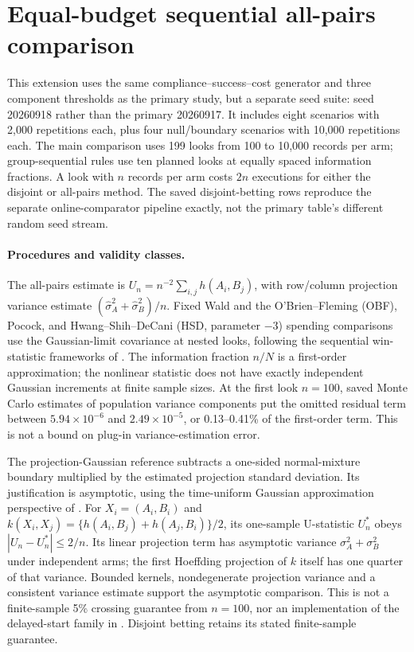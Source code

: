 \section{Equal-budget sequential all-pairs comparison}
\label{app:ustat_extension}
This extension uses the same compliance--success--cost generator and
three component thresholds as the primary study, but a separate seed
suite: seed 20260918 rather than the primary 20260917. It includes eight
scenarios with 2,000 repetitions each, plus four null/boundary scenarios
with 10,000 repetitions each. The main comparison uses 199 looks from
100 to 10,000 records per arm; group-sequential rules use ten planned
looks at equally spaced information fractions. A look with $n$ records
per arm costs $2n$ executions for either the disjoint or all-pairs method.
The saved disjoint-betting rows reproduce the separate online-comparator
pipeline exactly, not the primary table's different random seed stream.

\paragraph{Procedures and validity classes.}
The all-pairs estimate is $U_n=n^{-2}\sum_{i,j}h(A_i,B_j)$, with
row/column projection variance estimate
$(\widehat\sigma_A^2+\widehat\sigma_B^2)/n$.
Fixed Wald and the O'Brien--Fleming (OBF), Pocock, and Hwang--Shih--DeCani
(HSD, parameter $-3$) spending comparisons use the Gaussian-limit
covariance at nested looks, following the sequential win-statistic
frameworks of \citet{zhang2024sequential,bergemann2026group}.
The information fraction $n/N$ is a first-order approximation; the
nonlinear statistic does not have exactly independent Gaussian increments
at finite sample sizes. At the first look $n=100$, saved Monte Carlo
estimates of population variance components put the omitted residual term between
$5.94\times10^{-6}$ and $2.49\times10^{-5}$, or 0.13--0.41\% of the
first-order term. This is not a bound on plug-in variance-estimation error.

The projection-Gaussian reference subtracts a one-sided normal-mixture
boundary multiplied by the estimated projection standard deviation.
Its justification is asymptotic, using the time-uniform Gaussian
approximation perspective of \citet{waudbysmith2024timeuniform}.
For $X_i=(A_i,B_i)$ and
$k(X_i,X_j)=\{h(A_i,B_j)+h(A_j,B_i)\}/2$, its one-sample U-statistic
$U_n^*$ obeys $|U_n-U_n^*|\leq2/n$. Its linear projection term has
asymptotic variance $\sigma_A^2+\sigma_B^2$ under independent arms;
the first Hoeffding projection of $k$ itself has one quarter of that
variance. Bounded kernels,
nondegenerate projection variance and a consistent variance estimate
support the asymptotic comparison. This is not a finite-sample
5\% crossing guarantee from $n=100$, nor an implementation of the
delayed-start family in \citet{cai2026ustatistics}.
Disjoint betting retains its stated finite-sample guarantee.

